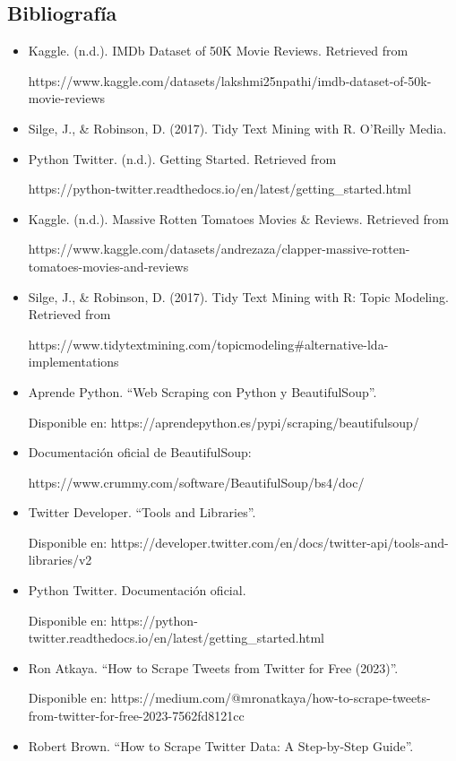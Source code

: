 \documentclass[
  letterpaper,
  DIV=11,
  numbers=noendperiod]{scrartcl}
\begin{document}
\subsection{Bibliografía}\label{bibliografuxeda}

\begin{itemize}
\item
  Kaggle. (n.d.). IMDb Dataset of 50K Movie Reviews. Retrieved from

  https://www.kaggle.com/datasets/lakshmi25npathi/imdb-dataset-of-50k-movie-reviews
\item
  Silge, J., \& Robinson, D. (2017). Tidy Text Mining with R. O'Reilly
  Media.
\item
  Python Twitter. (n.d.). Getting Started. Retrieved from

  https://python-twitter.readthedocs.io/en/latest/getting\_started.html
\item
  Kaggle. (n.d.). Massive Rotten Tomatoes Movies \& Reviews. Retrieved
  from

  https://www.kaggle.com/datasets/andrezaza/clapper-massive-rotten-tomatoes-movies-and-reviews
\item
  Silge, J., \& Robinson, D. (2017). Tidy Text Mining with R: Topic
  Modeling. Retrieved from

  https://www.tidytextmining.com/topicmodeling\#alternative-lda-implementations
\item
  Aprende Python. ``Web Scraping con Python y BeautifulSoup''.

  Disponible en: https://aprendepython.es/pypi/scraping/beautifulsoup/
\item
  Documentación oficial de BeautifulSoup:

  https://www.crummy.com/software/BeautifulSoup/bs4/doc/
\item
  Twitter Developer. ``Tools and Libraries''.

  Disponible en:
  https://developer.twitter.com/en/docs/twitter-api/tools-and-libraries/v2
\item
  Python Twitter. Documentación oficial.

  Disponible en:
  https://python-twitter.readthedocs.io/en/latest/getting\_started.html
\item
  Ron Atkaya. ``How to Scrape Tweets from Twitter for Free (2023)''.

  Disponible en:
  https://medium.com/@mronatkaya/how-to-scrape-tweets-from-twitter-for-free-2023-7562fd8121cc
\item
  Robert Brown. ``How to Scrape Twitter Data: A Step-by-Step Guide''.


\end{itemize}
\end{document}
